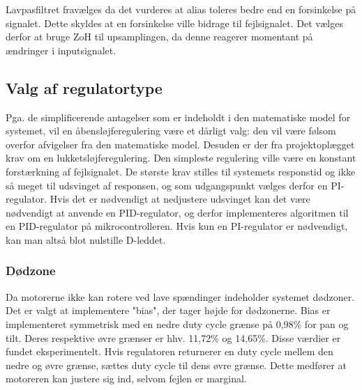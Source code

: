 Lavpasfiltret fravælges da det vurderes at alias toleres bedre end en forsinkelse på signalet. Dette skyldes at en forsinkelse ville bidrage til fejlsignalet. 
Det vælges derfor at bruge ZoH til upsamplingen, da denne reagerer momentant på ændringer i inputsignalet. 



\subsection{Valg af regulatortype}
\label{ss:ValgReg}
Pga. de simplificerende antagelser som er indeholdt i den matematiske model for systemet,
vil en åbensløjferegulering være et dårligt valg: den vil være følsom overfor afvigelser fra den
matematiske model. Desuden er der fra projektoplægget krav om en lukketsløjferegulering.
Den simpleste regulering ville være en konstant forstærkning af fejlsignalet.
De største krav stilles til systemets responstid og ikke så meget til udsvinget af responsen,
og som udgangspunkt vælges derfor en PI-regulator.
Hvis det er nødvendigt at nedjustere udsvinget kan det være nødvendigt at anvende en PID-regulator,
og derfor implementeres algoritmen til en PID-regulator på mikrocontrolleren.
Hvis kun en PI-regulator er nødvendigt, kan man altså blot nulstille D-leddet.

\subsubsection{Dødzone}
Da motorerne ikke kan rotere ved lave spændinger indeholder systemet dødzoner.
Det er valgt at implementere "bias", der tager højde for dødzonerne.
Bias er implementeret symmetrisk med en nedre duty cycle grænse på 0,98\% for pan og tilt.
Deres respektive øvre grænser er hhv. 11,72\% og 14,65\%.
Disse værdier er fundet eksperimentelt.
Hvis regulatoren returnerer en duty cycle mellem den nedre og øvre grænse, sættes duty cycle til dens øvre grænse.
Dette medfører at motoreren kan justere sig ind, selvom fejlen er marginal.

